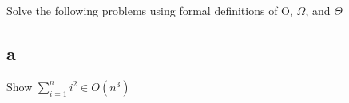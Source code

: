 Solve the following problems using formal definitions of O, $\Omega$, and $\Theta$
\subsection*{a}

Show $\sum_{i=1}^{n} i^2 \in O(n^3) $